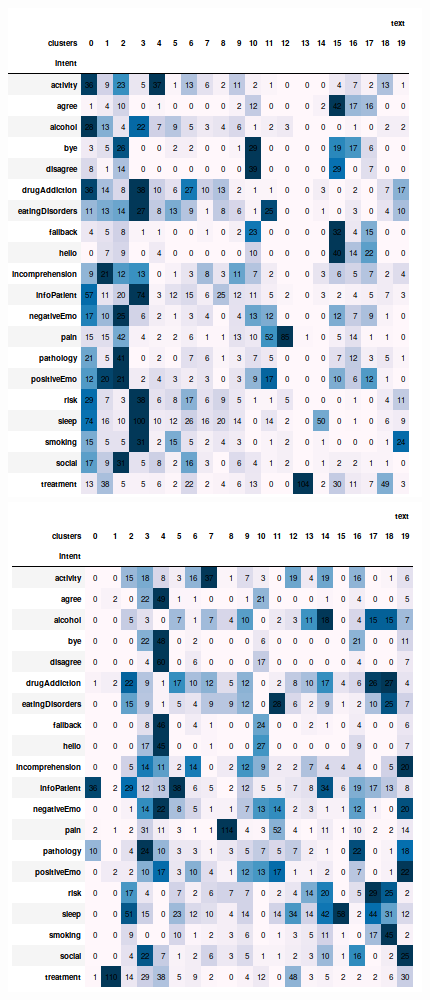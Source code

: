 \documentclass[11pt]{article}
\begin{document}
\begin{figure}[h]
	\centering
	\includegraphics[scale=0.28]{bilstm_ac_cm.png}
	\includegraphics[scale=0.28]{bilstm_gm_cm.png}

\end{figure}
\end{document}
